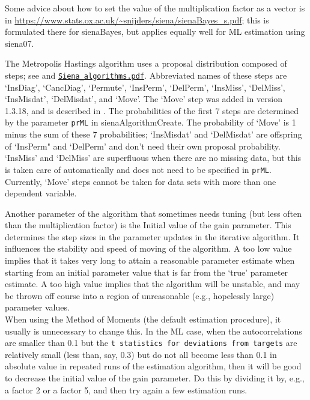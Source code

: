 \documentclass[a4paper,fleqn,11pt]{article}
\newcommand{\+}{\, + \,}
\begin{document}
Some advice about how to set the value of the multiplication factor
as a vector is in
\url{https://www.stats.ox.ac.uk/~snijders/siena/sienaBayes_s.pdf};
this is formulated there for \textsf{sienaBayes}, but applies
equally well for ML estimation using \textsf{siena07}.
\medskip

The Metropolis Hastings algorithm uses a proposal distribution
composed of steps; see \citet{SnijdersEA10a} and
\href{http://www.stats.ox.ac.uk/~snijders/siena/Siena_algorithms.pdf}{\texttt{Siena\_algorithms.pdf}}.
Abbreviated names of these steps are `InsDiag', `CancDiag', `Permute', `InsPerm',
`DelPerm', `InsMiss', `DelMiss', `InsMisdat', `DelMisdat', and `Move'.
The `Move' step was added in version 1.3.18, and is described in
\citet{Greenan2015}.
The probabilities of the first 7 steps are determined by the parameter \texttt{prML}
in  \textsf{sienaAlgorithmCreate}. The probability of  `Move' is 1 minus the sum
of these 7 probabilities; `InsMisdat' and `DelMisdat' are offspring of `InsPerm" and
`DelPerm' and don't need their own proposal probability.
 `InsMiss' and  `DelMiss' are superfluous when there are no missing data,
but this is taken care of automatically and does not need to be specified in \texttt{prML}.
Currently, `Move' steps cannot be taken for data sets with
more than one dependent variable.
\medskip

Another parameter of the algorithm that sometimes needs tuning
(but less often than the multiplication factor)
is the \textsf{Initial value of the gain parameter}.
This determines the step sizes in the parameter updates in the iterative
algorithm.
It influences the stability and speed of moving of the algorithm.
A too low value implies that it takes very long to attain a
reasonable parameter estimate when starting from an initial
parameter value that is far from the `true' parameter estimate.
A too high value implies that the algorithm will be unstable,
and may be thrown off course into a region of unreasonable
(e.g., hopelessly large) parameter values.\\
When using the Method of Moments
(the default estimation procedure), it usually is unnecessary to change
this. In the ML case, when the autocorrelations are smaller
than 0.1 but the \texttt{t statistics for deviations from targets}
are relatively small (less than, say, 0.3) but do not all become
less than 0.1 in absolute value in repeated runs of the
estimation algorithm, then it will be good to decrease the
\textsf{initial value of the gain parameter}. Do this by dividing
it by, e.g., a factor 2 or a factor 5, and then try again
a few estimation runs.
\end{document}
